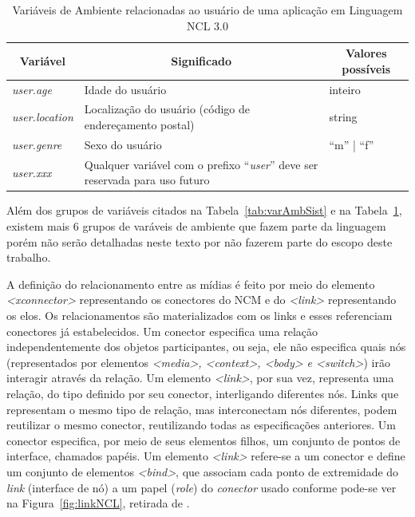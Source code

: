 \begin{table}[!ht] \footnotesize
\caption{Variáveis de Ambiente relacionadas ao usuário de uma aplicação em Linguagem NCL 3.0 \cite{soares2009programando}}
\label{tab:varUser}
\centering
{
  \renewcommand\arraystretch{0.5}
  \begin{tabular}{|p{4cm}|p{6cm}|p{5cm}|} \hline
  \multicolumn{1}{|c|}{Variável} & \multicolumn{1}{c|}{Significado} & \multicolumn{1}{c|}{Valores possíveis} \\\hline 
    \textit{user.age} & Idade do usuário & inteiro \\\hline
    \textit{user.location} & Localização do usuário (código de endereçamento postal) & string \\\hline
    \textit{user.genre} & Sexo do usuário & “m” | “f” \\\hline
    \textit{user.xxx} & Qualquer variável com o prefixo “\textit{user}” deve ser reservada para uso futuro & \\\hline
 \end{tabular}
}
\end{table}

Além dos grupos de variáveis citados na Tabela~\ref{tab:varAmbSist} e na Tabela~\ref{tab:varUser}, existem mais 6 grupos de varáveis de ambiente que fazem parte da linguagem porém não serão detalhadas neste texto por não fazerem parte do escopo deste trabalho.

A definição do relacionamento entre as mídias é feito por meio do elemento \textit{<xconnector>} representando os conectores do NCM e do \textit{<link>} representando os elos. Os relacionamentos são materializados com os links e esses referenciam conectores já estabelecidos. Um conector especifica uma relação independentemente dos objetos participantes, ou seja, ele não especifica quais nós (representados por elementos \textit{<media>, <context>, <body> e <switch>}) irão interagir através da relação. Um elemento \textit{<link>}, por sua vez, representa uma relação, do tipo definido por seu conector, interligando diferentes nós. Links que representam o mesmo tipo de relação, mas interconectam nós diferentes, podem reutilizar o mesmo conector, reutilizando todas as especificações anteriores. Um conector especifica, por meio de seus elementos filhos, um conjunto de pontos de interface, chamados papéis. Um elemento \textit{<link>} refere-se a um conector e define um conjunto de elementos \textit{<bind>}, que associam cada ponto de extremidade do \textit{link} (interface de nó) a um papel (\textit{role}) do \textit{conector} usado conforme pode-se ver na Figura~\ref{fig:linkNCL}, retirada de \cite{soares2009programando}.

